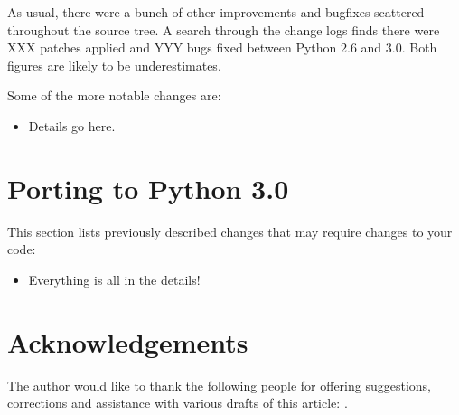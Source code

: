 \documentclass{howto}
\begin{document}
As usual, there were a bunch of other improvements and bugfixes
scattered throughout the source tree.  A search through the change
logs finds there were XXX patches applied and YYY bugs fixed between
Python 2.6 and 3.0.  Both figures are likely to be underestimates.

Some of the more notable changes are:

\begin{itemize}

\item Details go here.

\end{itemize}


\section{Porting to Python 3.0}

This section lists previously described changes that may require
changes to your code:

\begin{itemize}

\item Everything is all in the details!

\end{itemize}


\section{Acknowledgements \label{acks}}

The author would like to thank the following people for offering
suggestions, corrections and assistance with various drafts of this
article: .
\end{document}
